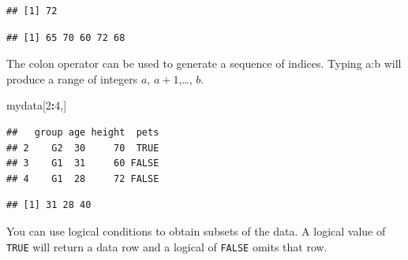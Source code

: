 \documentclass[
]{book}
\newenvironment{Shaded}{\begin{snugshade}}{\end{snugshade}}
\newcommand{\DecValTok}[1]{\textcolor[rgb]{0.00,0.00,0.81}{#1}}
\newcommand{\KeywordTok}[1]{\textcolor[rgb]{0.13,0.29,0.53}{\textbf{#1}}}
\newcommand{\NormalTok}[1]{#1}
\newcommand{\OperatorTok}[1]{\textcolor[rgb]{0.81,0.36,0.00}{\textbf{#1}}}
\newcommand{\StringTok}[1]{\textcolor[rgb]{0.31,0.60,0.02}{#1}}
\begin{document}
\begin{verbatim}
## [1] 72
\end{verbatim}

\begin{Shaded}
\end{Shaded}

\begin{verbatim}
## [1] 65 70 60 72 68
\end{verbatim}

The colon operator can be used to generate a sequence of indices. Typing a:b will produce a range of integers \(a\), \(a+1\),\ldots, \(b\).

\begin{Shaded}
\begin{Highlighting}[]
\NormalTok{mydata[}\DecValTok{2}\OperatorTok{:}\DecValTok{4}\NormalTok{,]}
\end{Highlighting}
\end{Shaded}

\begin{verbatim}
##   group age height  pets
## 2    G2  30     70  TRUE
## 3    G1  31     60 FALSE
## 4    G1  28     72 FALSE
\end{verbatim}

\begin{Shaded}
\end{Shaded}

\begin{verbatim}
## [1] 31 28 40
\end{verbatim}

You can use logical conditions to obtain subsets of the data. A logical value of \texttt{TRUE} will return a data row and a logical of \texttt{FALSE} omits that row.

\begin{Shaded}
\end{Shaded}
\end{document}
